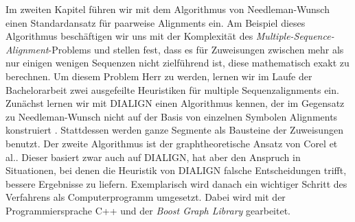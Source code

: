 Im zweiten Kapitel führen wir mit dem Algorithmus von Needleman-Wunsch einen Standardansatz für paarweise Alignments ein. Am Beispiel dieses Algorithmus beschäftigen wir uns mit der Komplexität des \emph{Multiple-Sequence-Alignment}-Problems und stellen fest, dass es für Zuweisungen zwischen mehr als nur einigen wenigen Sequenzen nicht zielführend ist, diese mathematisch exakt zu berechnen. Um diesem Problem Herr zu werden, lernen wir im Laufe der Bachelorarbeit zwei ausgefeilte Heuristiken für multiple Sequenzalignments ein. Zunächst lernen wir mit DIALIGN einen Algorithmus kennen, der im Gegensatz zu Needleman-Wunsch nicht auf der Basis von einzelnen Symbolen Alignments konstruiert \cite{mdw96}. Stattdessen werden ganze Segmente als Bausteine der Zuweisungen benutzt. Der zweite Algorithmus ist der graphtheoretische Ansatz von Corel et al.\cite{cpm10}. Dieser basiert zwar auch auf DIALIGN, hat aber den Anspruch in Situationen, bei denen die Heuristik von DIALIGN falsche Entscheidungen trifft, bessere Ergebnisse zu liefern. Exemplarisch wird danach ein wichtiger Schritt des Verfahrens als Computerprogramm umgesetzt. Dabei wird mit der Programmiersprache C++ und der \emph{Boost Graph Library} gearbeitet.









